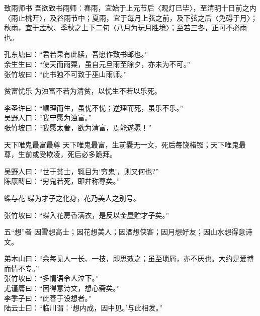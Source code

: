 \begin{yulu}{致雨师书}
吾欲致书雨师：春雨，宜始于上元节后〈观灯已毕〉，至清明十日前之内〈雨止桃开〉，及谷雨节中；夏雨，宜于每月上弦之前，及下弦之后〈免碍于月〉；秋雨，宜于孟秋、季秋之上下二旬〈八月为玩月胜境〉；至若三冬，正可不必雨也。
\begin{comments}
孔东塘曰：“君若果有此牍，吾愿作致书邮也。” \\
余生生曰：“使天而雨粟，虽自元旦雨至除夕，亦未为不可。” \\
张竹坡曰：“此书独不可致于巫山雨师。”
\end{comments}
\end{yulu}

\begin{yulu}{贫富忧乐}
为浊富不若为清贫，以忧生不若以乐死。
\begin{comments}
李圣许曰：“顺理而生，虽忧不忧；逆理而死，虽乐不乐。” \\
吴野人曰：“我宁愿为浊富。” \\
张竹坡曰：“我愿太奢，欲为清富，焉能遂愿！”
\end{comments}
\end{yulu}

\begin{yulu}{天下唯鬼最富最尊}
天下唯鬼最富，生前囊无一文，死后每饶楮镪；天下唯鬼最尊，生前或受欺凌，死后必多跪拜。
\begin{comments}
吴野人曰：“世于贫士，辄目为‘穷鬼’，则又何也?” \\
陈康畴曰：“穷鬼若死，即幷称尊矣。”
\end{comments}
\end{yulu}

\begin{yulu}{蝶与花}
蝶为才子之化身，花乃美人之别号。
\begin{comments}
张竹坡曰：“蝶入花房香满衣，是反以金屋贮才子矣。”
\end{comments}
\end{yulu}

\begin{yulu}{五“想”者}
因雪想高士；因花想美人；因酒想侠客；因月想好友；因山水想得意诗文。
\begin{comments}
弟木山曰：“余每见人一长、一技，即思效之；虽至琐屑，亦不厌也。大约是爱博而情不专。” \\
张竹坡曰：“多情语令人泣下。” \\
尤谨庸曰：“因得意诗文，想心斋矣。” \\
李季子曰：“此善于设想者。” \\
陆云士曰：“临川谓：‘想内成，因中见。’与此相发。”
\end{comments}
\end{yulu}

